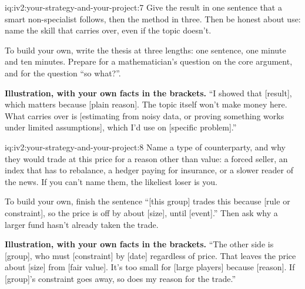 \begin{solution}{iq:iv2:your-strategy-and-your-project:7}
Give the result in one sentence that a smart non-specialist follows, then the method in three. Then be honest about use: name the skill that carries over, even if the topic doesn't.

To build your own, write the thesis at three lengths: one sentence, one minute and ten minutes. Prepare for a mathematician's question on the core argument, and for the question ``so what?''.

\textbf{Illustration, with your own facts in the brackets.} ``I showed that [result], which matters because [plain reason]. The topic itself won't make money here. What carries over is [estimating from noisy data, or proving something works under limited assumptions], which I'd use on [specific problem].''

\end{solution}

\begin{solution}{iq:iv2:your-strategy-and-your-project:8}
Name a type of counterparty, and why they would trade at this price for a reason other than value: a forced seller, an index that has to rebalance, a hedger paying for insurance, or a slower reader of the news. If you can't name them, the likeliest loser is you.

To build your own, finish the sentence ``[this group] trades this because [rule or constraint], so the price is off by about [size], until [event].'' Then ask why a larger fund hasn't already taken the trade.

\textbf{Illustration, with your own facts in the brackets.} ``The other side is [group], who must [constraint] by [date] regardless of price. That leaves the price about [size] from [fair value]. It's too small for [large players] because [reason]. If [group]'s constraint goes away, so does my reason for the trade.''

\end{solution}

